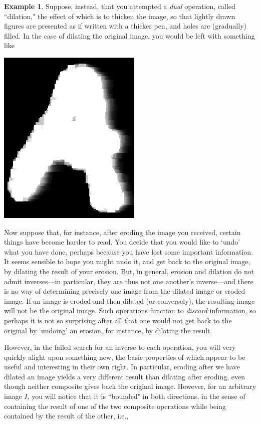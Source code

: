 \documentclass[11pt]{book}
\theoremstyle{definition}
\newtheorem{example}{Example}[section]
\theoremstyle{definition}
\theoremstyle{definition}
\theoremstyle{theorem}
\theoremstyle{definition}
\begin{document}
\begin{example}
	Suppose, instead, that you attempted a \textit{dual} operation, called ``dilation,"  the effect of which is to thicken the image, so that lightly drawn figures are presented as if written with a thicker pen, and holes are (gradually) filled. In the case of dilating the original image, you would be left with something like 
	\begin{center}
		\includegraphics*[scale=0.25]{LetterAAfterDilate.png}
	\end{center} 
	Now suppose that, for instance, after eroding the image you received, certain things have become harder to read. You decide that you would like to `undo' what you have done, perhaps because you have lost some important information. It seems sensible to hope you might undo it, and get back to the original image, by dilating the result of your erosion. But, in general, erosion and dilation do not admit inverses---in particular, they are thus not one another's inverse---and there is no way of determining precisely one image from the dilated image or eroded image. If an image is eroded and then dilated (or conversely), the resulting image will not be the original image. Such operations function to \textit{discard} information, so perhaps it is not so surprising after all that one would not get back to the original by `undoing' an erosion, for instance, by dilating the result.  \par 
	However, in the failed search for an inverse to each operation, you will very quickly alight upon something new, the basic properties of which appear to be useful and interesting in their own right. In particular, eroding after we have dilated an image yields a very different result than dilating after eroding, even though neither composite gives back the original image. However, for an arbitrary image $I$, you will notice that it is ``bounded" in both directions, in the sense of containing the result of one of the two composite operations while being contained by the result of the other, i.e.,  

\end{example}
\end{document}
